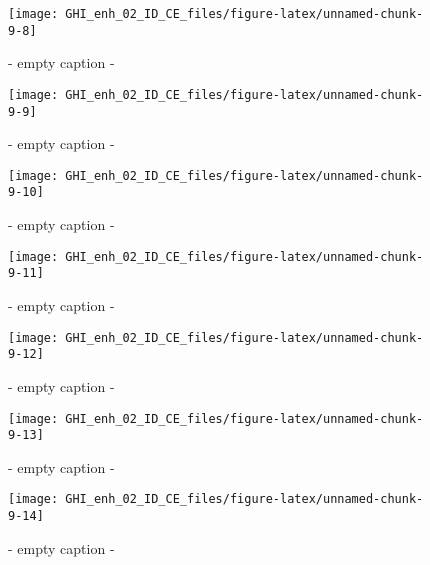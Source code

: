 \documentclass[
  10pt,
  a4paper,oneside]{article}
\begin{document}
\begin{figure}[H]

{\centering \texttt{[image: GHI\_enh\_02\_ID\_CE\_files/figure-latex/unnamed-chunk-9-8]} 

}

\caption{ - empty caption - }\label{fig:unnamed-chunk-9-8}
\end{figure}
\begin{figure}[H]

{\centering \texttt{[image: GHI\_enh\_02\_ID\_CE\_files/figure-latex/unnamed-chunk-9-9]} 

}

\caption{ - empty caption - }\label{fig:unnamed-chunk-9-9}
\end{figure}
\begin{figure}[H]

{\centering \texttt{[image: GHI\_enh\_02\_ID\_CE\_files/figure-latex/unnamed-chunk-9-10]} 

}

\caption{ - empty caption - }\label{fig:unnamed-chunk-9-10}
\end{figure}
\begin{figure}[H]

{\centering \texttt{[image: GHI\_enh\_02\_ID\_CE\_files/figure-latex/unnamed-chunk-9-11]} 

}

\caption{ - empty caption - }\label{fig:unnamed-chunk-9-11}
\end{figure}
\begin{figure}[H]

{\centering \texttt{[image: GHI\_enh\_02\_ID\_CE\_files/figure-latex/unnamed-chunk-9-12]} 

}

\caption{ - empty caption - }\label{fig:unnamed-chunk-9-12}
\end{figure}
\begin{figure}[H]

{\centering \texttt{[image: GHI\_enh\_02\_ID\_CE\_files/figure-latex/unnamed-chunk-9-13]} 

}

\caption{ - empty caption - }\label{fig:unnamed-chunk-9-13}
\end{figure}
\begin{figure}[H]

{\centering \texttt{[image: GHI\_enh\_02\_ID\_CE\_files/figure-latex/unnamed-chunk-9-14]} 

}

\caption{ - empty caption - }\label{fig:unnamed-chunk-9-14}
\end{figure}
\end{document}
